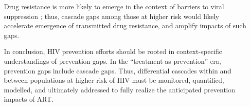 Drug resistance is more likely to emerge
in the context of barriers to viral suppression \cite{Pham2014};
thus, cascade gaps among those at higher risk
would likely accelerate emergence of transmitted drug resistance, and amplify impacts of such gaps.
\par
In conclusion, HIV prevention efforts should be rooted in  
context-specific understandings of prevention gaps.
In the ``treatment as prevention'' era, prevention gaps include cascade gaps.
Thus, differential cascades within and between populations at higher risk of HIV
must be monitored, quantified, modelled, and ultimately addressed
to fully realize the anticipated prevention impacts of ART.
\enlargethispage{2ex} %
